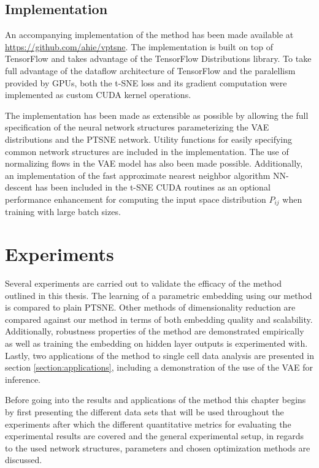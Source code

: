 \section{Implementation}
\label{section:implementation}

An accompanying implementation of the method has been made available at \url{https://github.com/ahie/vptsne}. The implementation is built on top of TensorFlow \cite{tensorflow} and takes advantage of the TensorFlow Distributions \cite{tensorflow_distributions} library. To take full advantage of the dataflow architecture of TensorFlow and the paralellism provided by GPUs, both the t-SNE loss and its gradient computation were implemented as custom CUDA \cite{cuda} kernel operations.

The implementation has been made as extensible as possible by allowing the full specification of the neural network structures parameterizing the VAE distributions and the PTSNE network. Utility functions for easily specifying common network structures are included in the implementation. The use of normalizing flows in the VAE model has also been made possible. Additionally, an implementation of the fast approximate nearest neighbor algorithm NN-descent \cite{nn_descent} has been included in the t-SNE CUDA routines as an optional performance enhancement for computing the input space distribution $P_{ij}$ when training with large batch sizes.

\chapter{Experiments}
\label{ch:experiments}

Several experiments are carried out to validate the efficacy of the method outlined in this thesis. The learning of a parametric embedding using our method is compared to plain PTSNE. Other methods of dimensionality reduction are compared against our method in terms of both embedding quality and scalability. Additionally, robustness properties of the method are demonstrated empirically as well as training the embedding on hidden layer outputs is experimented with. Lastly, two applications of the method to single cell data analysis are presented in section \ref{section:applications}, including a demonstration of the use of the VAE for inference.

Before going into the results and applications of the method this chapter begins by first presenting the different data sets that will be used throughout the experiments after which the different quantitative metrics for evaluating the experimental results are covered and the general experimental setup, in regards to the used network structures, parameters and chosen optimization methods are discussed.

